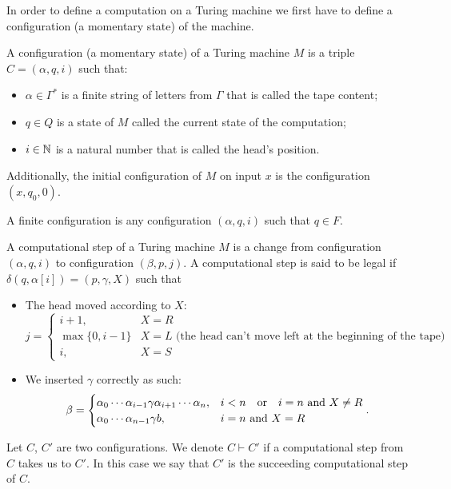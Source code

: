 \documentclass[11pt,a4paper]{article}
\begin{document}
  In order to define a computation on a Turing machine we first have
  to define a configuration (a momentary state) of the machine.

  \begin{definition}[Configuration]
    A configuration (a momentary state) of a Turing machine $M$ is
    a triple $C = (\alpha, q, i)$ such that:
    \begin{itemize}
      \item $\alpha \in \Gamma^*$ is a finite string of letters from $\Gamma$
        that is called the tape content;
      \item $q \in Q$ is a state of $M$ called the current state of the
        computation;
      \item $i \in \mathbb{N}$ is a natural number that is called the head's 
        position.
    \end{itemize}
    Additionally, the initial configuration of $M$ on input $x$ is
    the configuration $(x,q_0,0)$.
  \end{definition}

  \begin{definition}
    A finite configuration is any configuration $(\alpha,q,i)$ such that
    $q \in F$.
  \end{definition}
  
  \begin{definition}
    A computational step of a Turing machine $M$ is a change from
    configuration $(\alpha,q,i)$ to configuration $(\beta,p,j)$.
    A computational step is said to be legal if
    $\delta(q,\alpha[i]) = (p,\gamma,X)$ such that
    \begin{itemize}
      \item The head moved according to $X$:
        \[
          j =
          \begin{cases}
            i + 1, &X=R \\
            \max\{0,i-1\} &X=L \text{ 
            (the head can't move left at the beginning of the tape)} \\
            i, &X=S
          \end{cases}.
        \]
      \item We inserted $\gamma$ correctly as such:
        \[
          \beta =
          \begin{cases}
            \alpha_0 \cdots \alpha_{i-1} \gamma \alpha_{i+1} \cdots \alpha_n,
            &i < n \quad \text{or} \quad i = n \text{ and } X \neq R \\
            \alpha_0 \cdots \alpha_{n-1} \gamma b, &i = n \text{ and } X = R
          \end{cases}.
        \]
    \end{itemize}
  \end{definition}
  \begin{remark}
    Let $C$, $C'$ are two configurations.
    We denote $C \vdash C'$ if a computational step from $C$ takes us
    to $C'$.
    In this case we say that $C'$ is the succeeding computational step
    of $C$.
  \end{remark}
\end{document}
